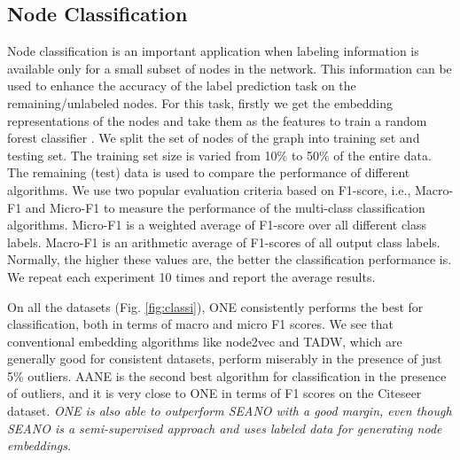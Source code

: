 \documentclass[letterpaper]{article} %
\begin{document}
\subsection{Node Classification}
Node classification is an important application when labeling information is available only for a small subset of nodes in the network. This information can be used to enhance the accuracy of the label prediction task on the remaining/unlabeled nodes.
For this task, firstly we get the embedding representations of the nodes and take them as the features to train a random forest classifier \cite{liaw2002classification}.
We split the set of nodes of the graph into training set and testing set. The training set size is varied from 10\% to 50\% of the entire data. The remaining (test) data is used to compare the performance of different algorithms.
We use two popular evaluation criteria based on F1-score, i.e., Macro-F1 and Micro-F1 to measure the performance of the multi-class classification algorithms. Micro-F1 is a weighted average of F1-score over all different class labels. Macro-F1 is an arithmetic average of F1-scores of all output class labels. Normally, the higher these values are, the better the classification performance is. We repeat each experiment 10 times and report the average results.

On all the datasets (Fig. \ref{fig:classi}), ONE consistently performs the best for classification, both in terms of macro and micro F1 scores. We see that conventional embedding algorithms like node2vec and TADW, which are generally good for consistent datasets, perform miserably in the presence of just 5\% outliers. AANE is the second best algorithm for classification in the presence of outliers, and it is very close to ONE in terms of F1 scores on the Citeseer dataset. {\it ONE is also able to outperform SEANO with a good margin, even though SEANO is a semi-supervised approach and uses labeled data for generating node embeddings}.
\end{document}

